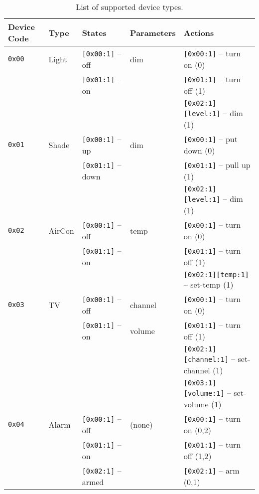 \begin{table}[ht!]
\centering
\begin{tabular}{l l l l l}
\hline
\textbf{Device Code} & \textbf{Type} & \textbf{States} & \textbf{Parameters} & \textbf{Actions} \\
\hline
\hline

{\tt 0x00}  & Light     & {\tt [0x00:1]} -- off    & dim    & {\tt [0x00:1]} -- turn on (0) \\
            &           & {\tt [0x01:1]} -- on     &        & {\tt [0x01:1]} -- turn off (1) \\
            &           &                          &        & {\tt [0x02:1][level:1]} -- dim (1) \\
\hline
{\tt 0x01}  & Shade     & {\tt [0x00:1]} -- up     & dim    & {\tt [0x00:1]} -- put down (0) \\
            &           & {\tt [0x01:1]} -- down   &        & {\tt [0x01:1]} -- pull up (1) \\
            &           &                          &        & {\tt [0x02:1][level:1]} -- dim (1) \\
\hline
{\tt 0x02}  & AirCon    & {\tt [0x00:1]} -- off    & temp   & {\tt [0x00:1]} -- turn on (0) \\
            &           & {\tt [0x01:1]} -- on     &        & {\tt [0x01:1]} -- turn off (1) \\
            &           &                          &        & {\tt [0x02:1][temp:1]} -- set-temp (1) \\
\hline
{\tt 0x03}  & TV        & {\tt [0x00:1]} -- off    & channel& {\tt [0x00:1]} -- turn on (0) \\
            &           & {\tt [0x01:1]} -- on     & volume & {\tt [0x01:1]} -- turn off (1) \\
            &           &                          &        & {\tt [0x02:1][channel:1]} -- set-channel (1) \\
            &           &                          &        & {\tt [0x03:1][volume:1]} -- set-volume (1) \\
\hline
{\tt 0x04}  & Alarm     & {\tt [0x00:1]} -- off    & (none) & {\tt [0x00:1]} -- turn on (0,2) \\
            &           & {\tt [0x01:1]} -- on     &        & {\tt [0x01:1]} -- turn off (1,2) \\
            &           & {\tt [0x02:1]} -- armed  &        & {\tt [0x02:1]} -- arm (0,1) \\
\hline
\hline
\end{tabular}
\caption{\label{tab:pdus:pdu:init_types}List of supported device types.}
\end{table}

